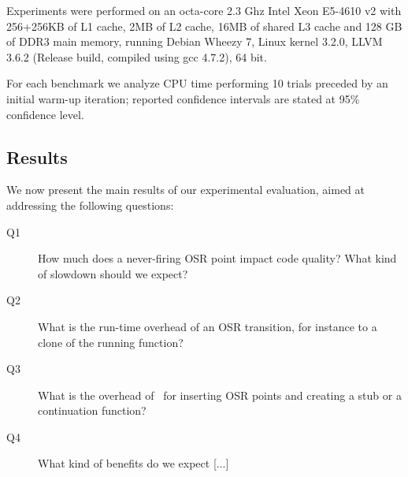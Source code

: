 Experiments were performed on an octa-core 2.3 Ghz Intel Xeon E5-4610 v2 with 256+256KB of L1 cache, 2MB of L2 cache, 16MB of shared L3 cache and 128 GB of DDR3 main memory, running Debian Wheezy 7, Linux kernel 3.2.0, LLVM 3.6.2 (Release build, compiled using gcc 4.7.2), 64 bit.

For each benchmark we analyze CPU time performing 10 trials preceded by an initial warm-up iteration; reported confidence intervals are stated at 95\% confidence level.

\subsection{Results}
We now present the main results of our experimental evaluation, aimed at addressing the following questions:

\begin{description}
\item[Q1] How much does a never-firing OSR point impact code quality? What kind of slowdown should we expect?
\item[Q2] What is the run-time overhead of an OSR transition, for instance to a clone of the running function?
\item[Q3] What is the overhead of \osrkit\ for inserting OSR points and creating a stub or a continuation function?
\item[Q4] What kind of benefits do we expect [...]
\end{description}


